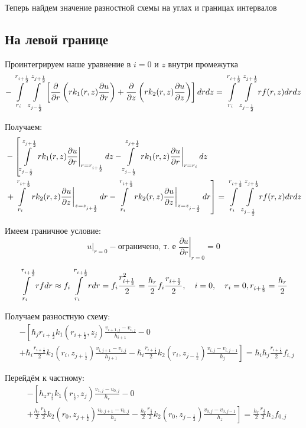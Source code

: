 Теперь найдем значение разностной схемы на углах и границах интервалов

\subsection{На левой границе}

Проинтегрируем наше уравнение в $ i = 0 $ и $ z $ внутри промежутка
\[
  - \mLim{+\frac{1}{2}}{}{+\frac{1}{2}}{-\frac{1}{2}} \left [ \pdv{}{r} \left ( r k_1(r, z) \pdv{u}{r} \right ) 
  + \pdv{}{z} \left ( rk_2(r, z)\pdv{u}{z} \right ) \right ] dr dz = \mLim{+\frac{1}{2}}{}{+\frac{1}{2}}{-\frac{1}{2}} rf(r, z) dr dz
\]

Получаем:
\begin{align*}
  &- \left [
   \mLimZ{z}{+\frac{1}{2}}{-\frac{1}{2}}{j}  \left . r k_1(r, z) \pdv{u}{r} \right \vert_{r = r_{i + \frac{1}{2}}} dz
  - \mLimZ{z}{+\frac{1}{2}}{-\frac{1}{2}}{j} \left . r k_1(r, z) \pdv{u}{r} \right \vert_{r = r_{i}} dz
  \right . \\
  &\left . + \mLimS{r}{+\frac{1}{2}}{} \left . rk_2(r, z)\pdv{u}{z} \right \vert_{z = z_{j + \frac{1}{2}}} dr
  - \mLimS{r}{+\frac{1}{2}}{} \left . rk_2(r, z)\pdv{u}{z} \right \vert_{z = z_{j - \frac{1}{2}}} dr
  \right ] = \mLim{+\frac{1}{2}}{}{+\frac{1}{2}}{-\frac{1}{2}} rf(r, z) dr dz
\end{align*}

Имеем граничное условие:
\[
  \left . u \right \vert_{r=0} - \text{ограничено, т. е } \left . \frac{\partial u}{ \partial r} \right |_{r = 0} = 0
\]

\[
  \mLimS{r}{+ \frac{1}{2}}{} rf dr \approx f_i \mLimS{r}{ + \frac{1}{2}}{} r dr = 
  f_i \frac{r^2_{i + \frac{1}{2}}}{2} = \frac{h_r}{2} f_i \frac{r_{i + \frac{1}{2}}}{2},
  \quad i = 0, \quad r_i = 0, r_{i + \frac{1}{2}} = \frac{h_r}{2}
\]


Получаем разностную схему:
\begin{align*}
  &- \left [ 
  \hbar_j r_{i+\frac{1}{2}} k_1(r_{i+\frac{1}{2}}, z_j) \frac{v_{i+1, j} - v_{i, j}}{h_{i + 1}}
  - 0
  \right . \\
  &\left .
  + \hbar_i \frac{r_{i + \frac{1}{2}}}{2} k_2(r_i, z_{j+\frac{1}{2}}) \frac{v_{i, j + 1} - v_{i, j}}{h_{j + 1}}
  - \hbar_i \frac{r_{i + \frac{1}{2}}}{2} k_2(r_i, z_{j-\frac{1}{2}}) \frac{v_{i, j} - v_{i, j - 1}}{h_j}
  \right ]  = \hbar_i \hbar_j \frac{r_{i + \frac{1}{2}}}{2} f_{i, j}
\end{align*}

Перейдём к частному:
\begin{align*}
  &- \left [ 
    h_z r_{\frac{1}{2}} k_1(r_{\frac{1}{2}}, z_j) \frac{v_{1, j} - v_{0, j}}{h_{r}}
    - 0
    \right . \\
    &\left .
    + \frac{h_r}{2} \frac{r_{\frac{1}{2}}}{2} k_2(r_0, z_{j+\frac{1}{2}}) \frac{v_{0, j + 1} - v_{0, j}}{h_{z}}
    - \frac{h_r}{2} \frac{r_{\frac{1}{2}}}{2} k_2(r_0, z_{j-\frac{1}{2}}) \frac{v_{0, j} - v_{0, j - 1}}{h_z}
    \right ]  = \frac{h_r}{2} \frac{r_{\frac{1}{2}}}{2} h_z f_{0, j}
\end{align*}

